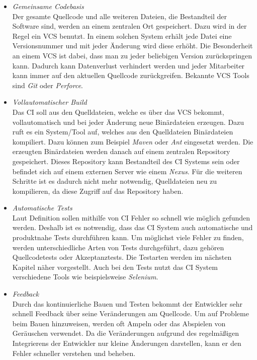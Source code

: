 \begin{itemize}
\item \textit{Gemeinsame Codebasis}\\
Der gesamte Quellcode und alle weiteren Dateien, die Bestandteil der Software sind, werden an einem zentralen Ort gespeichert. Dazu wird in der Regel ein \acs{VCS} benutzt. In einem solchen System erhält jede Datei eine Versionsnummer und mit jeder Änderung wird diese erhöht. Die Besonderheit an einem \acs{VCS}  ist dabei, dass man zu jeder beliebigen Version zurückspringen kann. Dadurch kann Datenverlust verhindert werden und jeder Mitarbeiter kann immer auf den aktuellen Quellcode zurückgreifen. Bekannte \acs{VCS} Tools sind \textit{Git} oder \textit{Perforce}.

\item \textit{Vollautomatischer Build}\\
Das \acs{CI} soll aus den Quelldateien, welche es über das \acs{VCS} bekommt, vollautomatisch und bei jeder Änderung neue Binärdateien erzeugen. Dazu ruft es ein System/Tool auf, welches aus den Quelldateien Binärdateien kompiliert. Dazu können zum Beispiel  \textit{Maven} oder \textit{Ant} eingesetzt werden. Die erzeugten Binärdateien werden danach auf einem zentralen Repository gespeichert. Dieses Repository kann Bestandteil des \acs{CI} Systems sein oder befindet sich auf einem externen Server wie einem \textit{Nexus}. Für die weiteren Schritte ist es dadurch nicht mehr notwendig, Quelldateien neu zu kompilieren, da diese Zugriff auf das Repository haben.

\item \textit{Automatische Tests}\\
Laut Definition sollen mithilfe von \acs{CI} Fehler so schnell wie möglich gefunden werden. Deshalb ist es notwendig, dass das \acs{CI} System auch automatische und produktnahe Tests durchführen kann. Um möglichst viele Fehler zu finden, werden unterschiedliche Arten von Tests durchgeführt, dazu gehören Quellcodetests oder Akzeptanztests. Die Testarten werden im nächsten Kapitel näher vorgestellt. Auch bei den Tests nutzt das \acs{CI} System verschiedene Tools wie beispielsweise \textit{Selenium}.

\item \textit{Feedback}\\
Durch das kontinuierliche  Bauen und Testen bekommt der Entwickler  sehr schnell Feedback über seine Veränderungen am Quellcode. Um auf Probleme beim Bauen hinzuweisen, werden oft Ampeln oder das Abspielen von Geräuschen verwendet. Da die Veränderungen aufgrund des regelmäßigen Integrierens der Entwickler nur kleine Änderungen darstellen, kann er den Fehler schneller verstehen und beheben.
\end{itemize}

